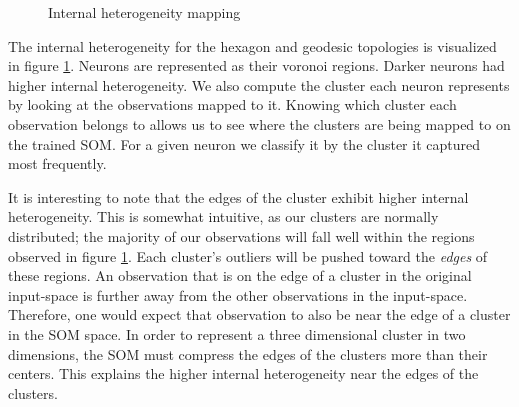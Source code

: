 \begin{figure}[ht]
\centering
\caption{Internal heterogeneity mapping}
\label{cluster}
\end{figure}

The internal heterogeneity for the hexagon and geodesic topologies is visualized
in figure \ref{cluster}.  Neurons are represented as their voronoi regions.
Darker neurons had higher internal heterogeneity.  We also compute the cluster
each neuron represents by looking at the observations mapped to it.  Knowing
which cluster each observation belongs to allows us to see where the clusters
are being mapped to on the trained SOM. For a given neuron we classify it by
the cluster it captured most frequently.

It is interesting to note that the edges of the cluster exhibit higher internal
heterogeneity.  This is somewhat intuitive, as our clusters are normally
distributed; the majority of our observations will fall well within the regions
observed in figure \ref{cluster}. Each cluster's outliers will be pushed toward
the \emph{edges} of these regions. An observation that is on the edge of a
cluster in the original input-space is further away from the other observations
in the input-space.  Therefore, one would expect that observation to also be
near the edge of a cluster in the SOM space.  In order to represent a three
dimensional cluster in two dimensions, the SOM must compress the edges of the
clusters more than their centers.  This explains the higher internal
heterogeneity near the edges of the clusters.


 

